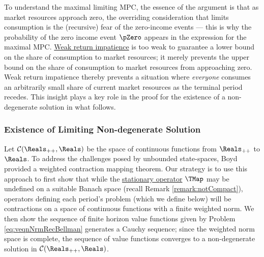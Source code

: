 \documentclass[\econtexRoot/BufferStockTheory]{subfiles}
\begin{document}

To understand the maximal limiting MPC, the essence of the argument is that as market resources approach zero, the overriding consideration that limits consumption is the (recursive) fear of the zero-income events --- this is why the probability of the zero income event $\pZero$ appears in the expression for the maximal MPC.
\hyperlink{WRIC}{Weak return impatience} is too weak to guarantee a lower bound on the share of consumption to market resources; it merely prevents the upper bound on the share of consumption to market resources from approaching zero.
Weak return impatience thereby prevents a situation where \textit{everyone} consumes an arbitrarily small share of current market resources as the terminal period recedes.
This insight plays a key role in the proof for the existence of a non-degenerate solution in what follows.

\hypertarget{Conditions-Under-Which-the-Problem-Defines-a-Contraction-Mapping}{}
\subsubsection{Existence of Limiting Non-degenerate Solution}\label{subsubsec:eventuallyCauchy}

Let $\mathcal{C}(\Reals_{++},\Reals)$ be the space of continuous functions from $\Reals_{++}$ to $\Reals$.
To address the challenges posed by unbounded state-spaces, Boyd~\citeyearpar{jboydWeighted} provided a weighted contraction mapping theorem.
Our strategy is to use this approach to first show that while the \hyperlink{Stationary-Bellman-Operator}{stationary operator} $\TMap$ may be undefined on a suitable Banach space (recall Remark \ref{remark:notCompact}), operators defining each period's problem (which we define below) will be contractions on a space of continuous functions with a finite weighted norm.
We then show the sequence of finite horizon value functions given by Problem \eqref{eq:veqnNrmRecBellman} generates a Cauchy sequence; since the weighted norm space is complete, the sequence of value functions converges to a non-degenerate solution in $\mathcal{C}(\Reals_{++},\Reals)$.
\end{document}
